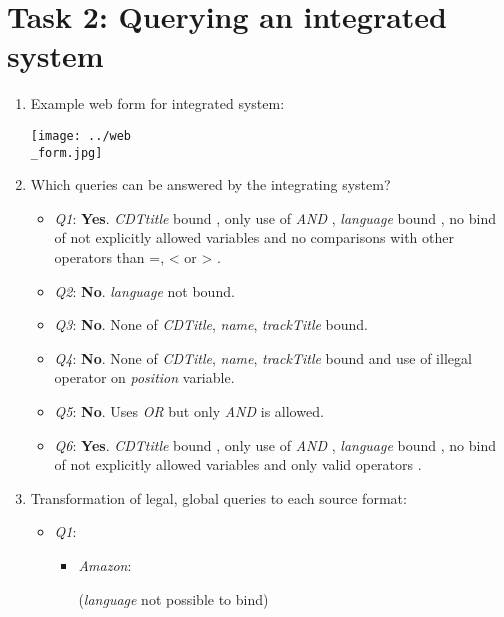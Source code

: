 \documentclass{scrartcl}
\begin{document}
	\section*{Task 2: Querying an integrated system}
	\begin{enumerate}
		\item Example web form for integrated system:
		\begin{center}
			\texttt{[image: ../web\\\_form.jpg]}
		\end{center}
	
		\item Which queries can be answered by the integrating system?
		\begin{itemize}
			\item \textit{Q1}: \textbf{Yes}.
			\textit{CDTtitle} bound \checkmark, only use of \textit{AND} \checkmark, \textit{language} bound \checkmark, no bind of not explicitly allowed variables \checkmark and no comparisons with other operators than =, < or > \checkmark.
			
			\item \textit{Q2}: \textbf{No}.
			\textit{language} not bound.
			
			\item \textit{Q3}: \textbf{No}.
			None of \textit{CDTitle}, \textit{name}, \textit{trackTitle} bound.
			
			\item \textit{Q4}: \textbf{No}.
			None of \textit{CDTitle}, \textit{name}, \textit{trackTitle} bound and use of illegal operator on \textit{position} variable.
			
			\item \textit{Q5}: \textbf{No}.
			Uses \textit{OR} but only \textit{AND} is allowed.
						
			\item \textit{Q6}: \textbf{Yes}.
			\textit{CDTtitle} bound \checkmark, only use of \textit{AND} \checkmark, \textit{language} bound \checkmark, no bind of not explicitly allowed variables \checkmark and only valid operators \checkmark.
		\end{itemize}
		
\newpage		
		
		\item Transformation of legal, global queries to each source format:
		\begin{itemize}
			\item \textit{Q1}:
			\begin{itemize}
				\item \textit{Amazon}:
				\begin{center}
				\end{center}
				(\textit{language} not possible to bind)
				

\end{itemize}
\end{itemize}
\end{enumerate}
\end{document}
